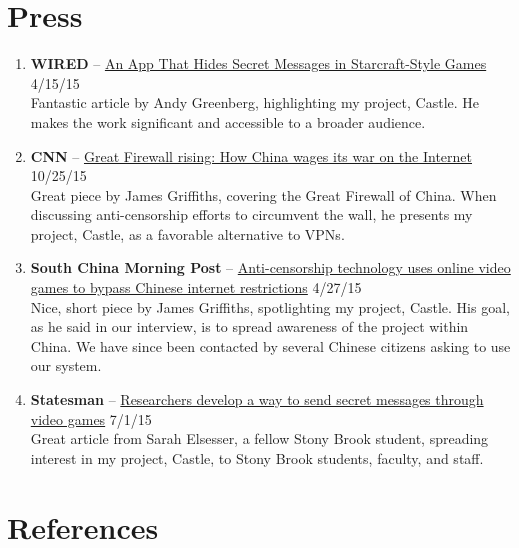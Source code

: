 \documentclass[11pt,a4paper,sans]{moderncv}        %
\begin{document}
\section{Press}
\begin{enumerate}
	\item \textbf{WIRED} -- \href{http://www.wired.com/2015/04/app-hides-secret-messages-starcraft-style-games/}{\color{blue}An App That Hides Secret Messages in Starcraft-Style Games} 4/15/15 \\
	Fantastic article by Andy Greenberg, highlighting my project, Castle. He makes the work significant and accessible to a broader audience.
	\item \textbf{CNN} -- \href{http://www.cnn.com/2015/10/25/asia/china-war-internet-great-firewall/}{\color{blue}Great Firewall rising: How China wages its war on the Internet} 10/25/15\\
	Great piece by James Griffiths, covering the Great Firewall of China. When discussing anti-censorship efforts to circumvent the wall, he presents my project, Castle, as a favorable alternative to VPNs.
	\item \textbf{South China Morning Post} -- \href{http://www.scmp.com/tech/apps-gaming/article/1775587/anti-censorship-technology-uses-online-video-games-bypass-chinese}{\color{blue}Anti-censorship technology uses online video games	to bypass Chinese internet restrictions} 4/27/15\\
	Nice, short piece by James Griffiths, spotlighting my project, Castle. His goal, as he said in our interview, is to spread awareness of the project within China. We have since been contacted by several Chinese citizens asking to use our system.
	\item \textbf{Statesman} -- \href{http://sbstatesman.com/2015/07/01/researchers-develop-a-way-to-send-secret-messages-through-video-games/}{\color{blue}Researchers develop a way to send secret messages through video games} 7/1/15 \\
	Great article from Sarah Elsesser, a fellow Stony Brook student, spreading interest in my project, Castle, to Stony Brook students, faculty, and staff.
\end{enumerate}

\section{References}
\begin{cvcolumns}
	\hspace{-3cm}
\end{cvcolumns}

\clearpage
\end{document}
